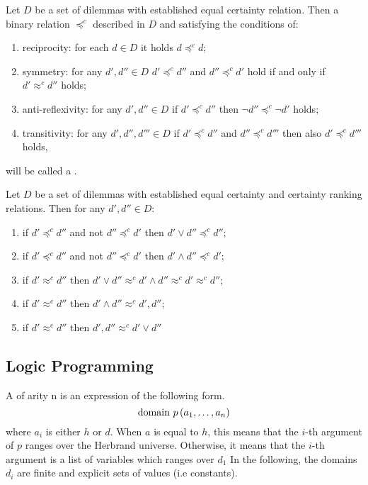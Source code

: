 \begin{defi}
Let $D$ be a set of dilemmas with established equal certainty relation. Then a binary relation $\preceq^c$ described in $D$ and satisfying the conditions of:
\begin{enumerate}
 \item reciprocity: for each $d\in D$ it holds $d\preceq^c d$;
 \item symmetry: for any $d',d''\in D$ $d'\preceq^c d''$ and $d''\preceq^c d'$ hold if and only if $d'\approx^c d''$ holds;
 \item anti-reflexivity: for any $d',d''\in D$ if $d'\preceq^c d''$ then $\neg d''\preceq^c\neg d'$ holds;
 \item transitivity: for any $d',d'',d'''\in D$ if $d'\preceq^c d''$ and $d''\preceq^c d'''$ then also $d'\preceq^c d'''$ holds,
\end{enumerate}
will be called a .
\cite{conf/fedcsis/Kulikowski12}
\end{defi}

\begin{theo}
Let $D$ be a set of dilemmas with established equal certainty and certainty ranking relations. Then for any $d',d''\in D$:
\begin{enumerate}
\item if $d'\preceq^c d''$ and not $d''\preceq^c d'$ then $d'\vee d''\preceq^c d''$;
\item if $d'\preceq^c d''$ and not $d''\preceq^c d'$ then $d'\wedge d''\preceq^c d'$;
\item if $d'\approx^c d''$ then $d'\vee d''\approx^c d'\wedge d''\approx^c d'\approx^c d''$;
\item if $d'\approx^c d''$ then $d'\wedge d''\approx^c d',d''$;
\item if $d'\approx^c d''$ then $d',d''\approx^c d'\vee d''$
\end{enumerate}
\cite{conf/fedcsis/Kulikowski12}
\end{theo}

\subsection{Logic Programming}

\begin{defi}
A  of arity n is an expression of the following form.
\begin{equation}
\mbox{domain }p\left(a_1,\ldots ,a_n\right)
\end{equation}
where $a_i$ is either $h$ or $d$. When $a$ is equal to $h$, this means that the $i$-th argument of $p$ ranges over the Herbrand universe. Otherwise, it means that the $i$-th argument is a list of variables which ranges over $d_1$ In the following, the domains $d_i$ are finite and explicit sets of values (i.e constants).
\cite{conf/ijcai/Hentenryck87}
\end{defi}


